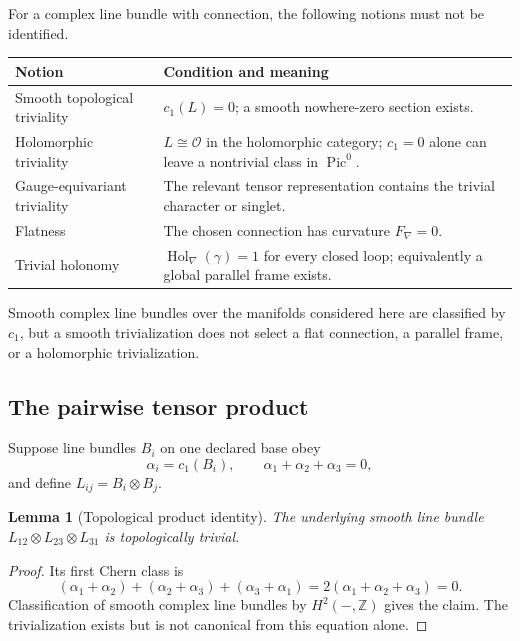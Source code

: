 \documentclass[11pt]{article}
\theoremstyle{plain}
\newtheorem{lemma}[theorem]{Lemma}
\theoremstyle{definition}
\theoremstyle{remark}
\newcommand{\Z}{\mathbb{Z}}
\newcommand{\Hol}{\operatorname{Hol}}
\begin{document}
For a complex line bundle with connection, the following notions must not be
identified.

\begin{center}
\begin{tabular}{>{\raggedright\arraybackslash}p{}
                >{\raggedright\arraybackslash}p{}}
\hline
Notion & Condition and meaning \\
\hline
Smooth topological triviality & $c_1(L)=0$; a smooth nowhere-zero section exists. \\
Holomorphic triviality & $L\cong\mathcal O$ in the holomorphic category; $c_1=0$ alone can leave a nontrivial class in $\operatorname{Pic}^0$. \\
Gauge-equivariant triviality & The relevant tensor representation contains the trivial character or singlet. \\
Flatness & The chosen connection has curvature $F_\nabla=0$. \\
Trivial holonomy & $\Hol_\nabla(\gamma)=1$ for every closed loop; equivalently a global parallel frame exists. \\
\hline
\end{tabular}
\end{center}

Smooth complex line bundles over the manifolds considered here are classified
by $c_1$, but a smooth trivialization does not select a flat connection, a
parallel frame, or a holomorphic trivialization.

\subsection{The pairwise tensor product}

Suppose line bundles $B_i$ on one declared base obey
\[
 \alpha_i=c_1(B_i),\qquad \alpha_1+\alpha_2+\alpha_3=0,
\]
and define $L_{ij}=B_i\otimes B_j$.

\begin{lemma}[Topological product identity]
\label{lem:top-product}
The underlying smooth line bundle
$L_{12}\otimes L_{23}\otimes L_{31}$ is topologically trivial.
\end{lemma}

\begin{proof}
Its first Chern class is
\[
 (\alpha_1+\alpha_2)+(\alpha_2+\alpha_3)+(\alpha_3+\alpha_1)
 =2(\alpha_1+\alpha_2+\alpha_3)=0.
\]
Classification of smooth complex line bundles by $H^2(-,\Z)$ gives the claim.
The trivialization exists but is not canonical from this equation alone.
\end{proof}
\end{document}
